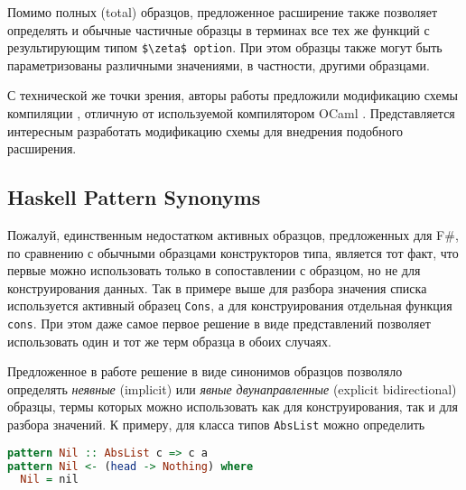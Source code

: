 Помимо полных (total) образцов, предложенное расширение также позволяет определять и обычные частичные образцы в терминах все тех же функций с результирующим типом \lstinline[breaklines]|$\zeta$ option|. При этом образцы также могут быть параметризованы различными значениями, в частности, другими образцами.

С технической же точки зрения, авторы работы предложили модификацию схемы компиляции \cite{scott2000whendo}, отличную от используемой компилятором OCaml \cite{fessant2001optimizing}. Представляется интересным разработать модификацию схемы \cite{fessant2001optimizing} для внедрения подобного расширения.

\subsection{Haskell Pattern Synonyms}
Пожалуй, единственным недостатком активных образцов, предложенных для F\#, по сравнению с обычными образцами конструкторов типа, является тот факт, что первые можно использовать только в сопоставлении с образцом, но не для конструирования данных. Так в примере выше для разбора значения списка используется активный образец \lstinline|Cons|, а для конструирования отдельная функция \lstinline|cons|. При этом даже самое первое решение в виде представлений \cite{wadler1987views} позволяет использовать один и тот же терм образца в обоих случаях.

Предложенное в работе \cite{pickering2016pattern} решение в виде синонимов образцов позволяло определять \textit{неявные} (implicit) или \textit{явные двунаправленные} (expli\-cit bidirectional) образцы, термы которых можно использовать как для конструирования, так и для разбора значений. К примеру, для класса типов \lstinline|AbsList| можно определить


\noindent
\begin{minipage}{\linewidth}
\begin{lstlisting}[language=haskell]
pattern Nil :: AbsList c => c a
pattern Nil <- (head -> Nothing) where
  Nil = nil
\end{lstlisting}
\end{minipage}

